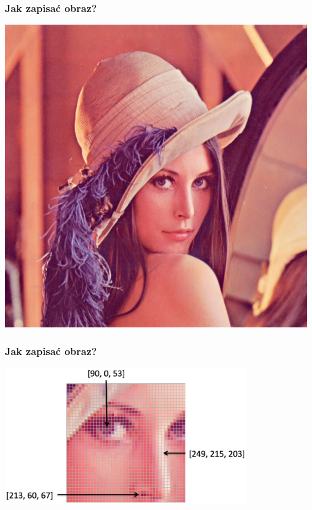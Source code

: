 \documentclass{beamer}
\begin{document}
            \begin{frame}
                \begin{center}
                    \frametitle{Jak zapisać obraz?}
                    \includegraphics[height=0.8\textheight]{pictures/Lenna.png}
                \end{center} 
            \end{frame}

            \begin{frame}
                \begin{center}
                    \frametitle{Jak zapisać obraz?}
                    \includegraphics[width=0.8\textwidth]{pictures/colorpixels.png}
                \end{center}
            \end{frame}
\end{document}
